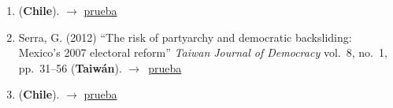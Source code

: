 \documentclass[12 pt, letter]{article}
\newenvironment{CitasMiTrabajo}{
    \begin{footnotesize}
    \begin{enumerate}[label={\footnotesize\emph{cita~\arabic*}},ref=\arabic*] %
        \setlength{\itemsep}{.1\itemsep}
        \setlength{\parskip}{.1\parskip}
    }{\end{enumerate}\end{footnotesize}}
\begin{document}

        \begin{CitasMiTrabajo}

        \item {} (\textbf{Chile}). $\rightarrow$ \href{http://ericmagar.com/cv/cites/magarRomero2008/palma2010.pdf}{prueba}

        \item Serra, G. (2012)
            ``The risk of partyarchy and democratic backsliding: Mexico's 2007 electoral reform''
            \emph{Taiwan Journal of Democracy}
            vol.\ 8, no.\ 1, pp.\ 31--56 (\textbf{Taiw\'an}). $\rightarrow$~\href{http://ericmagar.com/cv/cites/estevezEtalElecStud/serraElecRefMexico2012tjd.pdf}{prueba}

        \item {} (\textbf{Chile}). $\rightarrow$ \href{http://ericmagar.com/cv/cites/magarRomero2008/maldonado2013.pdf}{prueba}

        \label{ncites:magar.romero.2008} %

        \end{CitasMiTrabajo}

\end{document}
